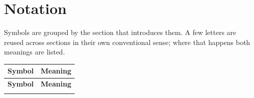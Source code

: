 \documentclass{article}
\begin{document}
\newpage
\tableofcontents
\newpage

\section*{Notation}
Symbols are grouped by the section that introduces them. A few letters are reused
across sections in their own conventional sense; where that happens both meanings
are listed.

\renewcommand{\arraystretch}{1.25}
\begin{longtable}{@{}p{} p{}@{}}
\toprule
\textbf{Symbol} & \textbf{Meaning} \\
\midrule
\endfirsthead
\toprule
\textbf{Symbol} & \textbf{Meaning} \\
\midrule
\endhead
\bottomrule
\endfoot


\end{longtable}
\end{document}
